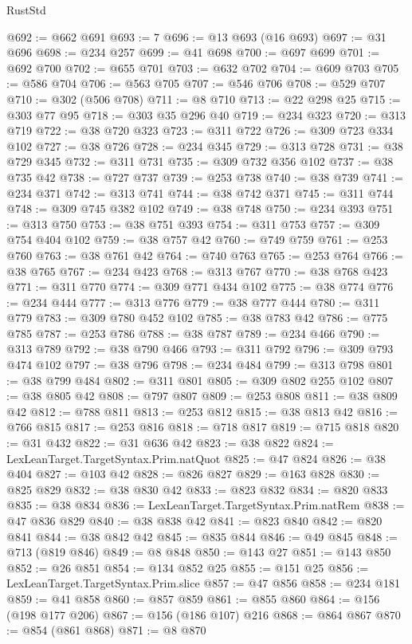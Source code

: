 \begin{lexlean}{RustStd}
\begin{coremodule}
@692 := @662 @691
@693 := 7
@696 := @13 @693 (@16 @693)
@697 := @31 @696
@698 := @234 @257
@699 := @41 @698
@700 := @697 @699
@701 := @692 @700
@702 := @655 @701
@703 := @632 @702
@704 := @609 @703
@705 := @586 @704
@706 := @563 @705
@707 := @546 @706
@708 := @529 @707
@710 := @302 (@506 @708)
@711 := @8 @710
@713 := @22 @298 @25
@715 := @303 @77 @95
@718 := @303 @35 @296 @40
@719 := @234 @323
@720 := @313 @719
@722 := @38 @720 @323
@723 := @311 @722
@726 := @309 @723 @334 @102
@727 := @38 @726
@728 := @234 @345
@729 := @313 @728
@731 := @38 @729 @345
@732 := @311 @731
@735 := @309 @732 @356 @102
@737 := @38 @735 @42
@738 := @727 @737
@739 := @253 @738
@740 := @38 @739
@741 := @234 @371
@742 := @313 @741
@744 := @38 @742 @371
@745 := @311 @744
@748 := @309 @745 @382 @102
@749 := @38 @748
@750 := @234 @393
@751 := @313 @750
@753 := @38 @751 @393
@754 := @311 @753
@757 := @309 @754 @404 @102
@759 := @38 @757 @42
@760 := @749 @759
@761 := @253 @760
@763 := @38 @761 @42
@764 := @740 @763
@765 := @253 @764
@766 := @38 @765
@767 := @234 @423
@768 := @313 @767
@770 := @38 @768 @423
@771 := @311 @770
@774 := @309 @771 @434 @102
@775 := @38 @774
@776 := @234 @444
@777 := @313 @776
@779 := @38 @777 @444
@780 := @311 @779
@783 := @309 @780 @452 @102
@785 := @38 @783 @42
@786 := @775 @785
@787 := @253 @786
@788 := @38 @787
@789 := @234 @466
@790 := @313 @789
@792 := @38 @790 @466
@793 := @311 @792
@796 := @309 @793 @474 @102
@797 := @38 @796
@798 := @234 @484
@799 := @313 @798
@801 := @38 @799 @484
@802 := @311 @801
@805 := @309 @802 @255 @102
@807 := @38 @805 @42
@808 := @797 @807
@809 := @253 @808
@811 := @38 @809 @42
@812 := @788 @811
@813 := @253 @812
@815 := @38 @813 @42
@816 := @766 @815
@817 := @253 @816
@818 := @718 @817
@819 := @715 @818
@820 := @31 @432
@822 := @31 @636 @42
@823 := @38 @822
@824 := LexLeanTarget.TargetSyntax.Prim.natQuot
@825 := @47 @824
@826 := @38 @404
@827 := @103 @42
@828 := @826 @827
@829 := @163 @828
@830 := @825 @829
@832 := @38 @830 @42
@833 := @823 @832
@834 := @820 @833
@835 := @38 @834
@836 := LexLeanTarget.TargetSyntax.Prim.natRem
@838 := @47 @836 @829
@840 := @38 @838 @42
@841 := @823 @840
@842 := @820 @841
@844 := @38 @842 @42
@845 := @835 @844
@846 := @49 @845
@848 := @713 (@819 @846)
@849 := @8 @848
@850 := @143 @27
@851 := @143 @850
@852 := @26 @851
@854 := @134 @852 @25
@855 := @151 @25
@856 := LexLeanTarget.TargetSyntax.Prim.slice
@857 := @47 @856
@858 := @234 @181
@859 := @41 @858
@860 := @857 @859
@861 := @855 @860
@864 := @156 (@198 @177 @206)
@867 := @156 (@186 @107) @216
@868 := @864 @867
@870 := @854 (@861 @868)
@871 := @8 @870

\end{coremodule}
\end{lexlean}
